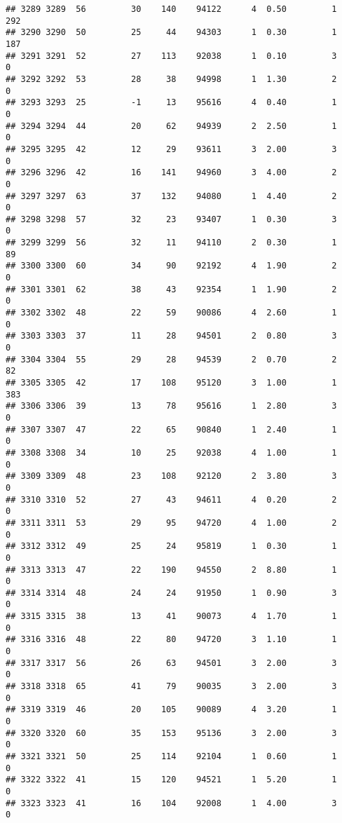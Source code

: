 \documentclass[
]{article}
\begin{document}
\begin{verbatim}
## 3289 3289  56         30    140    94122      4  0.50         1      292
## 3290 3290  50         25     44    94303      1  0.30         1      187
## 3291 3291  52         27    113    92038      1  0.10         3        0
## 3292 3292  53         28     38    94998      1  1.30         2        0
## 3293 3293  25         -1     13    95616      4  0.40         1        0
## 3294 3294  44         20     62    94939      2  2.50         1        0
## 3295 3295  42         12     29    93611      3  2.00         3        0
## 3296 3296  42         16    141    94960      3  4.00         2        0
## 3297 3297  63         37    132    94080      1  4.40         2        0
## 3298 3298  57         32     23    93407      1  0.30         3        0
## 3299 3299  56         32     11    94110      2  0.30         1       89
## 3300 3300  60         34     90    92192      4  1.90         2        0
## 3301 3301  62         38     43    92354      1  1.90         2        0
## 3302 3302  48         22     59    90086      4  2.60         1        0
## 3303 3303  37         11     28    94501      2  0.80         3        0
## 3304 3304  55         29     28    94539      2  0.70         2       82
## 3305 3305  42         17    108    95120      3  1.00         1      383
## 3306 3306  39         13     78    95616      1  2.80         3        0
## 3307 3307  47         22     65    90840      1  2.40         1        0
## 3308 3308  34         10     25    92038      4  1.00         1        0
## 3309 3309  48         23    108    92120      2  3.80         3        0
## 3310 3310  52         27     43    94611      4  0.20         2        0
## 3311 3311  53         29     95    94720      4  1.00         2        0
## 3312 3312  49         25     24    95819      1  0.30         1        0
## 3313 3313  47         22    190    94550      2  8.80         1        0
## 3314 3314  48         24     24    91950      1  0.90         3        0
## 3315 3315  38         13     41    90073      4  1.70         1        0
## 3316 3316  48         22     80    94720      3  1.10         1        0
## 3317 3317  56         26     63    94501      3  2.00         3        0
## 3318 3318  65         41     79    90035      3  2.00         3        0
## 3319 3319  46         20    105    90089      4  3.20         1        0
## 3320 3320  60         35    153    95136      3  2.00         3        0
## 3321 3321  50         25    114    92104      1  0.60         1        0
## 3322 3322  41         15    120    94521      1  5.20         1        0
## 3323 3323  41         16    104    92008      1  4.00         3        0

\end{verbatim}
\end{document}
